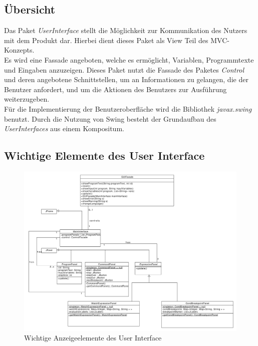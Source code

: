 \documentclass[parskip=full]{scrartcl}
\begin{document}
\subsection{Übersicht}
Das Paket \textit{UserInterface} stellt die Möglichkeit zur Kommunikation des Nutzers mit dem Produkt dar. Hierbei dient dieses Paket als View Teil des MVC-Konzepts. \\
Es wird eine Fassade angeboten, welche es ermöglicht, Variablen, Programmtexte und Eingaben anzuzeigen. Dieses Paket nutzt die Fassade des Paketes \textit{Control} und deren angebotene Schnittstellen, um an Informationen zu gelangen, die der Benutzer anfordert, und um die Aktionen des Benutzers zur Ausführung weiterzugeben. \\
Für die Implementierung der Benutzeroberfläche wird die Bibliothek \textit{javax.swing} benutzt. Durch die Nutzung von Swing besteht der Grundaufbau des \textit{UserInterfaces} aus einem Kompositum.
\subsection{Wichtige Elemente des User Interface}
\begin{figure}[!h]
\centering
\includegraphics[width=1.1\textwidth]{diagrammIdeenUmlet/GUIOverview.pdf}
\caption{Wichtige Anzeigeelemente des User Interface}
\label{GUIOverview}
\end{figure}
\end{document}
